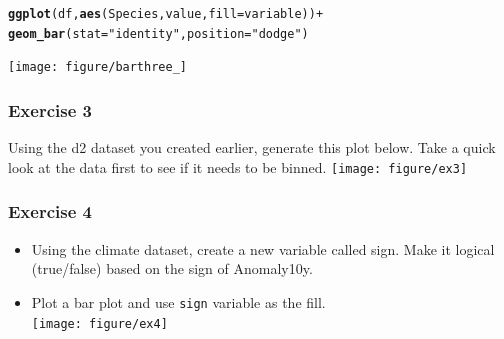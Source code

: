 \documentclass{beamer}\usepackage{graphicx, color}
\makeatletter
\newcommand{\hlfunctioncall}[1]{\textcolor[rgb]{0.501960784313725,0,0.329411764705882}{\textbf{#1}}}%
\newcommand{\hlstring}[1]{\textcolor[rgb]{0.6,0.6,1}{#1}}%
\newenvironment{kframe}{%
 \def\at@end@of@kframe{}%
 \ifinner\ifhmode%
  \def\at@end@of@kframe{\end{minipage}}%
  \begin{minipage}{\columnwidth}%
 \fi\fi%
 \def\FrameCommand##1{\hskip\@totalleftmargin \hskip-\fboxsep
 \colorbox{shadecolor}{##1}\hskip-\fboxsep
     \hskip-\linewidth \hskip-\@totalleftmargin \hskip\columnwidth}%
 \MakeFramed {\advance\hsize-\width
   \@totalleftmargin\z@ \linewidth\hsize
   \@setminipage}}%
 {\par\unskip\endMakeFramed%
 \at@end@of@kframe}
\newenvironment{knitrout}{}{} %
\makeatother
\begin{document}
\begin{frame}[fragile]
\begin{knitrout}\footnotesize
{}\color{fgcolor}\begin{kframe}
\begin{alltt}
\hlfunctioncall{ggplot}(df, \hlfunctioncall{aes}(Species, value, fill = variable)) +
\hlfunctioncall{geom_bar}(stat = \hlstring{"identity"}, position = \hlstring{"dodge"})
\end{alltt}
\end{kframe}
\texttt{[image: figure/barthree\_]} 

\end{knitrout}

\end{frame}

\begin{frame}[fragile]
\frametitle{Exercise 3}
Using the d2 dataset you created earlier, generate this plot below. Take a quick look at the data first to see if it needs to be binned.
\begin{knitrout}\footnotesize
{}\color{fgcolor}
\texttt{[image: figure/ex3]} 

\end{knitrout}

\end{frame}

\begin{frame}[fragile]
\frametitle{Exercise 4}
\begin{itemize}
\item Using the climate dataset, create a new variable called sign. Make it logical (true/false) based on the sign of Anomaly10y.
\item Plot a bar plot and use \texttt{sign} variable as the fill.\\
\begin{knitrout}\footnotesize
{}\color{fgcolor}
\texttt{[image: figure/ex4]} 

\end{knitrout}


\end{itemize}
\end{frame}


\end{document}
